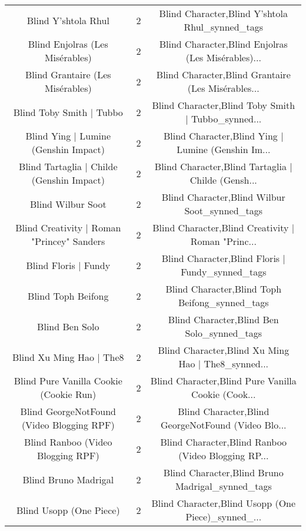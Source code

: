 \begin{table}[h!]
{\begin{tabular}{|c|c|c|}
                               Blind Y'shtola Rhul &          2 &    Blind Character,Blind Y'shtola Rhul\_synned\_tags \\
                   Blind Enjolras (Les Misérables) &          2 & Blind Character,Blind Enjolras (Les Misérables)... \\
                  Blind Grantaire (Les Misérables) &          2 & Blind Character,Blind Grantaire (Les Misérables... \\
                          Blind Toby Smith | Tubbo &          2 & Blind Character,Blind Toby Smith | Tubbo\_synned... \\
              Blind Ying | Lumine (Genshin Impact) &          2 & Blind Character,Blind Ying | Lumine (Genshin Im... \\
         Blind Tartaglia | Childe (Genshin Impact) &          2 & Blind Character,Blind Tartaglia | Childe (Gensh... \\
                                 Blind Wilbur Soot &          2 &      Blind Character,Blind Wilbur Soot\_synned\_tags \\
        Blind Creativity | Roman "Princey" Sanders &          2 & Blind Character,Blind Creativity | Roman "Princ... \\
                              Blind Floris | Fundy &          2 &   Blind Character,Blind Floris | Fundy\_synned\_tags \\
                                Blind Toph Beifong &          2 &     Blind Character,Blind Toph Beifong\_synned\_tags \\
                                    Blind Ben Solo &          2 &         Blind Character,Blind Ben Solo\_synned\_tags \\
                          Blind Xu Ming Hao | The8 &          2 & Blind Character,Blind Xu Ming Hao | The8\_synned... \\
            Blind Pure Vanilla Cookie (Cookie Run) &          2 & Blind Character,Blind Pure Vanilla Cookie (Cook... \\
         Blind GeorgeNotFound (Video Blogging RPF) &          2 & Blind Character,Blind GeorgeNotFound (Video Blo... \\
                 Blind Ranboo (Video Blogging RPF) &          2 & Blind Character,Blind Ranboo (Video Blogging RP... \\
                              Blind Bruno Madrigal &          2 &   Blind Character,Blind Bruno Madrigal\_synned\_tags \\
                           Blind Usopp (One Piece) &          2 & Blind Character,Blind Usopp (One Piece)\_synned\_... \\

\end{tabular}}
\end{table}
